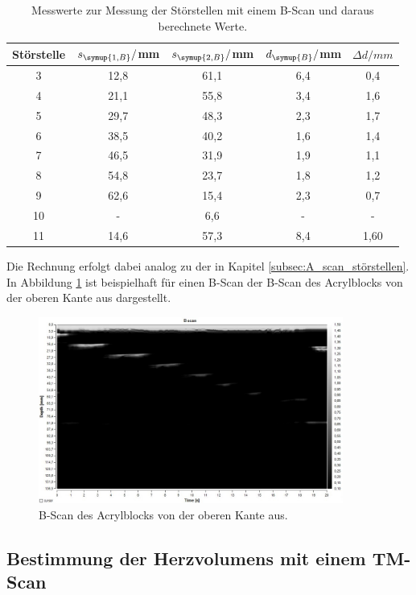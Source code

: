 \begin{table}[htp]
	\begin{center}
    \caption{Messwerte zur Messung der Störstellen mit einem B-Scan und daraus berechnete Werte.}
    \label{tab:b-scan}
		\begin{tabular}{ccccc}
		\toprule
			{Störstelle} & {$s_{\symup{1,B}}/$mm} & {$s_{\symup{2,B}}/$mm} & {$d_{\symup{B}}/$mm} & {$\Delta d/mm$}\\
			\midrule
			3 & 12,8 & 61,1 & 6,4 & 0,4\\
			4 & 21,1 & 55,8 & 3,4 & 1,6\\
			5 & 29,7 & 48,3 & 2,3 & 1,7\\
			6 & 38,5 & 40,2 & 1,6 & 1,4\\
			7 & 46,5 & 31,9 & 1,9 & 1,1\\
			8 & 54,8 & 23,7 & 1,8 & 1,2\\
			9 & 62,6 & 15,4 & 2,3 & 0,7\\
			10 & {-} & 6,6 & {-} & {-}\\
			11 & 14,6 & 57,3 & 8,4 & 1,60\\
		\bottomrule
		\end{tabular}
	\end{center}
\end{table}

Die Rechnung erfolgt dabei analog zu der in Kapitel \ref{subsec:A_scan_störstellen}.
In Abbildung \ref{fig:b-scan} ist beispielhaft für einen B-Scan der B-Scan des
Acrylblocks von der oberen Kante aus dargestellt.
\begin{figure}[H]
  \centering
  \includegraphics[width=10cm]{data/Bscanrechtsnachlinkswieinzeichnung.jpg}
  \caption{B-Scan des Acrylblocks von der oberen Kante aus.}
  \label{fig:b-scan}
\end{figure}

\subsection{Bestimmung der Herzvolumens mit einem TM-Scan}
\label{subsec:Herzvolumen}


